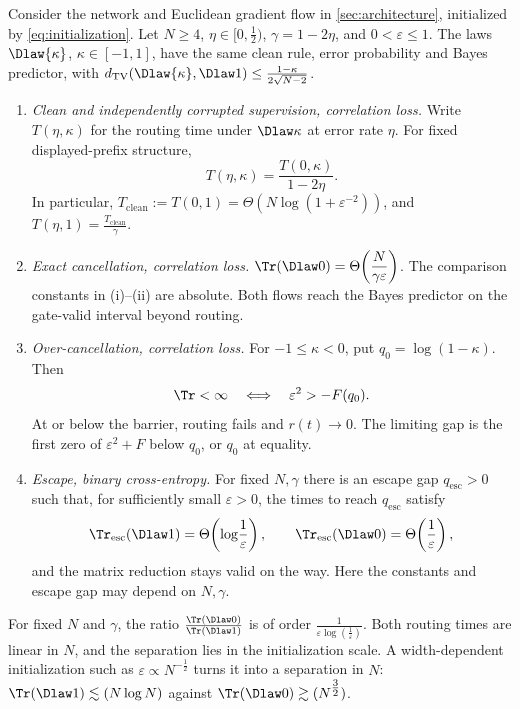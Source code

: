 \begin{mainresult}
\begin{theorem}
\label{thm:separation}
Consider the network and Euclidean gradient flow in \cref{sec:architecture}, initialized by \cref{eq:initialization}.
Let $N\ge4$, $\eta\in[0,\tfrac{1}{2})$, $\gamma=1-2\eta$, and $0<\varepsilon\le1$.
The laws $\Dlaw{\kappa}$, $\kappa\in[-1,1]$, have the same clean rule, error probability and Bayes predictor,
with $d_{\mathrm{TV}}(\Dlaw{\kappa},\Dlaw1)\le\tfrac{1-\kappa}{2\sqrt{N-2}}$.
\begin{enumerate}[label=(\roman*),leftmargin=*,itemsep=2pt,topsep=2pt]
\item \emph{Clean and independently corrupted supervision, correlation loss.}
Write $T(\eta,\kappa)$ for the routing time under $\Dlaw\kappa$ at error rate $\eta$.
For fixed displayed-prefix structure,
\[
 T(\eta,\kappa)=\frac{T(0,\kappa)}{1-2\eta}.
\]
In particular, $T_{\mathrm{clean}}:=T(0,1)=\Theta(N\log(1+\varepsilon^{-2}))$,
and $T(\eta,1)=\tfrac{T_{\mathrm{clean}}}{\gamma}$.
\item \emph{Exact cancellation, correlation loss.}
$\displaystyle \Tr(\Dlaw0)=\Theta\!\left(\frac{N}{\gamma \varepsilon}\right)$.
The comparison constants in (i)--(ii) are absolute. Both flows reach the Bayes predictor on the gate-valid interval beyond routing.
\item \emph{Over-cancellation, correlation loss.}
For $-1\le \kappa<0$, put $q_0=\log(1-\kappa)$. Then
\[
 \Tr<\infty\quad\Longleftrightarrow\quad \varepsilon^2>-F(q_0).
\]
At or below the barrier, routing fails and $r(t)\to0$.
The limiting gap is the first zero of $\varepsilon^2+F$ below $q_0$, or $q_0$ at equality.
\item \emph{Escape, binary cross-entropy.}
For fixed $N,\gamma$ there is an escape gap $q_{\mathrm{esc}}>0$ such that, for sufficiently small $\varepsilon>0$,
the times to reach $q_{\mathrm{esc}}$ satisfy
\[
 \Tr_{\mathrm{esc}}(\Dlaw1)=\Theta\!\left(\log\!\frac{1}{\varepsilon}\right),\qquad
 \Tr_{\mathrm{esc}}(\Dlaw0)=\Theta\!\left(\frac{1}{\varepsilon}\right),
\]
and the matrix reduction stays valid on the way.
Here the constants and escape gap may depend on $N,\gamma$.
\end{enumerate}
\end{theorem}
\end{mainresult}

For fixed $N$ and $\gamma$, the ratio $\tfrac{\Tr(\Dlaw0)}{\Tr(\Dlaw1)}$ is of order $\tfrac{1}{\varepsilon\log(\tfrac{1}{\varepsilon})}$. Both routing times are
linear in $N$, and the separation lies in the initialization scale. A width-dependent initialization such as $\varepsilon\propto N^{-\tfrac{1}{2}}$ turns it into a
separation in $N$: $\Tr(\Dlaw1)\lesssim(N\log N)$ against $\Tr(\Dlaw0)\gtrsim(N^{\tfrac{3}{2}})$.

